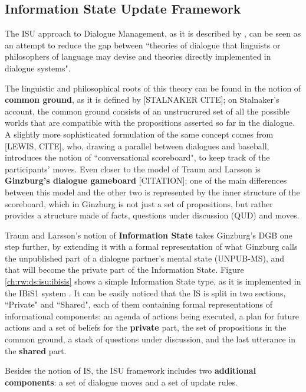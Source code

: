 \subsection{Information State Update Framework}\label{ch:rw:ds:isu}
The ISU approach to Dialogue Management, as it is described by \cite{TraumLarsson03p325}, can be seen as an attempt to reduce the gap between ``theories of dialogue that linguists or philosophers of language may devise and theories directly implemented in dialogue systems".

The linguistic and philosophical roots of this theory can be found in the notion of \textbf{common ground}, as it is defined by [STALNAKER CITE]; on Stalnaker's account, the common ground consists of an unstrucrured set of all the possible worlds that are compatible with the propositions asserted so far in the dialogue. A slightly more sophisticated formulation of the same concept comes from [LEWIS, CITE], who, drawing a parallel between dialogues and baseball, introduces the notion of ``conversational scoreboard", to keep track of the participants' moves. Even closer to the model of Traum and Larsson is \textbf{Ginzburg's dialogue gameboard} [CITATION]; one of the main differences between this model and the other two is represented by the inner structure of the scoreboard, which in Ginzburg is not just a set of propositions, but rather provides a structure made of facts, questions under discussion (QUD) and moves.

Traum and Larsson's notion of \textbf{Information State} takes Ginzburg's DGB one step further, by extending it with a formal representation of what Ginzburg calls the unpublished part of a dialogue partner's mental state (UNPUB-MS), and that will become the private part of the Information State. Figure \ref{ch:rw:ds:isu:ibisis} shows a simple Information State type, as it is implemented in the IBiS1 system \citep[p. 36]{Larsson02issue-baseddialogue}. It can be easily noticed that the IS is split in two sections, ``Private" and ``Shared", each of them containing formal representations of informational components: an agenda of actions being executed, a plan for future actions and a set of beliefs for the \textbf{private} part, the set of propositions in the common ground, a stack of questions under discussion, and the last utterance in the \textbf{shared} part.

Besides the notion of IS, the ISU framework includes two \textbf{additional components}: a set of dialogue moves and a set of update rules.

